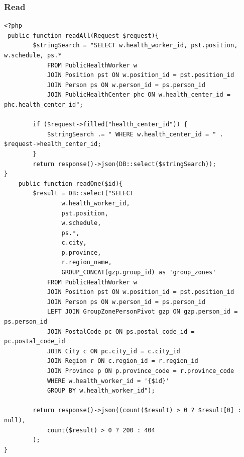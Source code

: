 \subsubsection{Read}
\begin{verbatim}
<?php
 public function readAll(Request $request){
        $stringSearch = "SELECT w.health_worker_id, pst.position, w.schedule, ps.*
            FROM PublicHealthWorker w
            JOIN Position pst ON w.position_id = pst.position_id
            JOIN Person ps ON w.person_id = ps.person_id
            JOIN PublicHealthCenter phc ON w.health_center_id = phc.health_center_id";

        if ($request->filled("health_center_id")) {
            $stringSearch .= " WHERE w.health_center_id = " . $request->health_center_id;
        }
        return response()->json(DB::select($stringSearch));
}
    public function readOne($id){
        $result = DB::select("SELECT
                w.health_worker_id,
                pst.position,
                w.schedule,
                ps.*,
                c.city,
                p.province,
                r.region_name,
                GROUP_CONCAT(gzp.group_id) as 'group_zones'
            FROM PublicHealthWorker w
            JOIN Position pst ON w.position_id = pst.position_id
            JOIN Person ps ON w.person_id = ps.person_id
            LEFT JOIN GroupZonePersonPivot gzp ON gzp.person_id = ps.person_id
            JOIN PostalCode pc ON ps.postal_code_id = pc.postal_code_id
            JOIN City c ON pc.city_id = c.city_id
            JOIN Region r ON c.region_id = r.region_id
            JOIN Province p ON p.province_code = r.province_code
            WHERE w.health_worker_id = '{$id}'
            GROUP BY w.health_worker_id");

        return response()->json((count($result) > 0 ? $result[0] : null),
            count($result) > 0 ? 200 : 404
        );
}

\end{verbatim}

